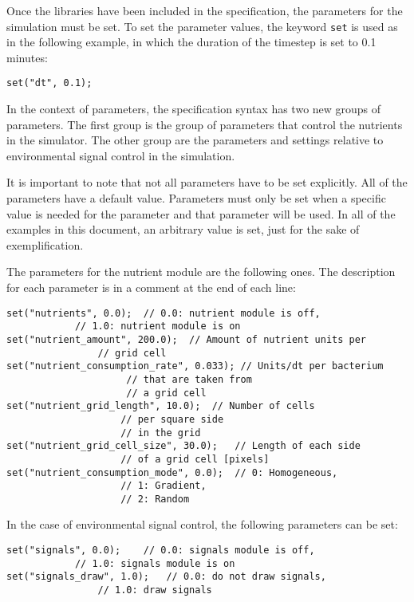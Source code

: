 \documentclass[10pt,a4paper]{article}
\begin{document}
Once the libraries have been included in the specification, the parameters for the simulation must be set. To set the parameter values, the keyword \texttt{set} is used as in the following example, in which the duration of the timestep is set to 0.1 minutes:

\begin{Verbatim}[obeytabs]
set("dt", 0.1);
\end{Verbatim}

In the context of parameters, the specification syntax has two new groups of parameters. The first group is the group of parameters that control the nutrients in the simulator. The other group are the parameters and settings relative to environmental signal control in the simulation.
\newline

It is important to note that not all parameters have to be set explicitly. All of the parameters have a default value. Parameters must only be set when a specific value is needed for the parameter and that parameter will be used. In all of the examples in this document, an arbitrary value is set, just for the sake of exemplification. \newline

The parameters for the nutrient module are the following ones. The description for each parameter is in a comment at the end of each line:

\begin{Verbatim}[obeytabs]
set("nutrients", 0.0);	// 0.0: nutrient module is off, 
			// 1.0: nutrient module is on
set("nutrient_amount", 200.0);	// Amount of nutrient units per 
				// grid cell
set("nutrient_consumption_rate", 0.033); // Units/dt per bacterium 
					 // that are taken from
					 // a grid cell
set("nutrient_grid_length", 10.0);	// Number of cells 
					// per square side
					// in the grid
set("nutrient_grid_cell_size", 30.0);	// Length of each side 
					// of a grid cell [pixels]
set("nutrient_consumption_mode", 0.0);	// 0: Homogeneous,
					// 1: Gradient,
					// 2: Random
\end{Verbatim}

In the case of environmental signal control, the following parameters can be set:

\begin{Verbatim}[obeytabs]
set("signals", 0.0);	// 0.0: signals module is off, 
			// 1.0: signals module is on
set("signals_draw", 1.0);	// 0.0: do not draw signals,
				// 1.0: draw signals
\end{Verbatim}
\end{document}

